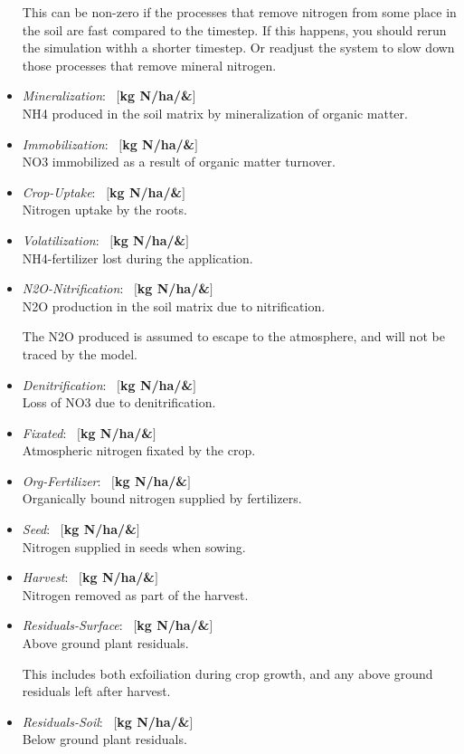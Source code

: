 \documentclass[a4paper]{article}
\begin{document}
\begin{itemize}
This can be non-zero if the processes that remove nitrogen from some
place in the soil are fast compared to the timestep.  If this
happens, you should rerun the simulation withh a shorter
timestep. Or readjust the system to slow down those processes
that remove mineral nitrogen.
\item \textit{Mineralization}: ~$[$\textbf{kg N/ha/\&}$]$\\
NH4 produced in the soil matrix by mineralization of organic matter.
\item \textit{Immobilization}: ~$[$\textbf{kg N/ha/\&}$]$\\
NO3 immobilized as a result of organic matter turnover.
\item \textit{Crop-Uptake}: ~$[$\textbf{kg N/ha/\&}$]$\\
Nitrogen uptake by the roots.
\item \textit{Volatilization}: ~$[$\textbf{kg N/ha/\&}$]$\\
NH4-fertilizer lost during the application.
\item \textit{N2O-Nitrification}: ~$[$\textbf{kg N/ha/\&}$]$\\
N2O production in the soil matrix due to nitrification.

The N2O produced is assumed to escape to the atmosphere, and will
not be traced by the model.
\item \textit{Denitrification}: ~$[$\textbf{kg N/ha/\&}$]$\\
Loss of NO3 due to denitrification.
\item \textit{Fixated}: ~$[$\textbf{kg N/ha/\&}$]$\\
Atmospheric nitrogen fixated by the crop.
\item \textit{Org-Fertilizer}: ~$[$\textbf{kg N/ha/\&}$]$\\
Organically bound nitrogen supplied by fertilizers.
\item \textit{Seed}: ~$[$\textbf{kg N/ha/\&}$]$\\
Nitrogen supplied in seeds when sowing.
\item \textit{Harvest}: ~$[$\textbf{kg N/ha/\&}$]$\\
Nitrogen removed as part of the harvest.
\item \textit{Residuals-Surface}: ~$[$\textbf{kg N/ha/\&}$]$\\
Above ground plant residuals.

This includes both exfoiliation during crop growth, and any above
ground residuals left after harvest.
\item \textit{Residuals-Soil}: ~$[$\textbf{kg N/ha/\&}$]$\\
Below ground plant residuals.


\end{itemize}
\end{document}
